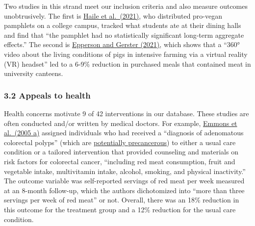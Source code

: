\documentclass[
  letterpaper,
  DIV=11,
  numbers=noendperiod]{scrartcl}
\begin{document}
Two studies in this strand meet our inclusion criteria and also measure
outcomes unobtrusively. The first is
\href{https://www.frontiersin.org/articles/10.3389/fpsyg.2021.668674/full}{Haile
et al.~(2021)}, who distributed pro-vegan pamphlets on a college campus,
tracked what students ate at their dining halls and find that ``the
pamphlet had no statistically significant long-term aggregate effects.''
The second is
\href{https://papers.ssrn.com/sol3/papers.cfm?abstract_id=3938994}{Epperson
and Gerster (2021)}, which shows that a ``360° video about the living
conditions of pigs in intensive farming via a virtual reality (VR)
headset'' led to a 6-9\% reduction in purchased meals that contained
meat in university canteens.

\hypertarget{appeals-to-health}{%
\subsubsection{3.2 Appeals to health}\label{appeals-to-health}}

Health concerns motivate 9 of 42 interventions in our database. These
studies are often conducted and/or written by medical doctors. For
example,
\href{https://aacrjournals.org/cebp/article/14/6/1453/258325/Project-PREVENT-A-Randomized-Trial-to-Reduce}{Emmons
et al.~(2005 a)} assigned individuals who had received a ``diagnosis of
adenomatous colorectal polyps'' (which are
\href{https://www.mountsinai.org/health-library/diseases-conditions/colorectal-polyps}{potentially
precancerous}) to either a usual care condition or a tailored
intervention that provided counseling and materials on risk factors for
colorectal cancer, ``including red meat consumption, fruit and vegetable
intake, multivitamin intake, alcohol, smoking, and physical
inactivity.'' The outcome variable was self-reported servings of red
meat per week measured at an 8-month follow-up, which the authors
dichotomized into ``more than three servings per week of red meat'' or
not. Overall, there was an 18\% reduction in this outcome for the
treatment group and a 12\% reduction for the usual care condition.
\end{document}
